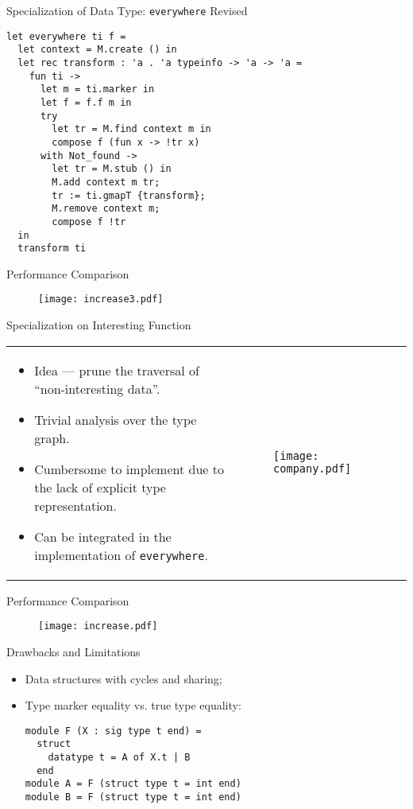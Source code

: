 \begin{frame}[fragile]{Specialization of Data Type: \texttt{everywhere} Revised}
\begin{lstlisting}
let everywhere ti f =
  let context = M.create () in
  let rec transform : 'a . 'a typeinfo -> 'a -> 'a =
    fun ti ->
      let m = ti.marker in
      let f = f.f m in
      try 
        let tr = M.find context m in
        compose f (fun x -> !tr x)
      with Not_found ->
        let tr = M.stub () in
        M.add context m tr;
        tr := ti.gmapT {transform};
        M.remove context m;
        compose f !tr
  in
  transform ti
\end{lstlisting}
\end{frame}

\begin{frame}{Performance Comparison}
\begin{figure}
\texttt{[image: increase3.pdf]}
\end{figure}
\end{frame}

\begin{frame}{Specialization on Interesting Function}

\begin{tabular}{p{7cm}p{3cm}}
  \small{
  \begin{itemize}  
    \item Idea --- prune the traversal of ``non-interesting data''.
    \item Trivial analysis over the type graph.
    \item Cumbersome to implement due to the lack of explicit type representation.
    \item Can be integrated in the implementation of \texttt{everywhere}.
  \end{itemize}
  } & 
  \begin{figure}  
     \texttt{[image: company.pdf]} 
  \end{figure}
\end{tabular}

\end{frame}

\begin{frame}{Performance Comparison}
\begin{figure}
\texttt{[image: increase.pdf]}
\end{figure}
\end{frame}

\begin{frame}[fragile]{Drawbacks and Limitations}
\begin{itemize}
   \item Data structures with cycles and sharing;
   \pause
   \item Type marker equality vs. true type equality:
\begin{lstlisting}
module F (X : sig type t end) =
  struct
    datatype t = A of X.t | B
  end
module A = F (struct type t = int end)
module B = F (struct type t = int end)
\end{lstlisting}
\end{itemize}
\end{frame}

